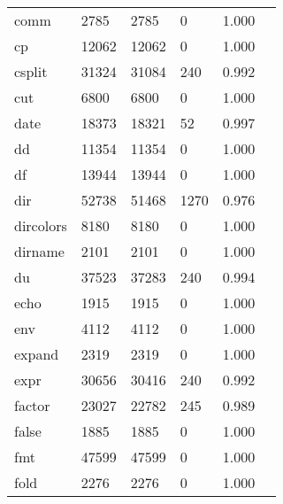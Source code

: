 \begin{longtable}{lp{2.40cm}p{2.40cm}p{2.40cm}p{2.40cm}p{2.40cm}}
comm      &                     2785 &         2785 &             0 &                    1.000 \\
cp        &                    12062 &        12062 &             0 &                    1.000 \\
csplit    &                    31324 &        31084 &           240 &                    0.992 \\
cut       &                     6800 &         6800 &             0 &                    1.000 \\
date      &                    18373 &        18321 &            52 &                    0.997 \\
dd        &                    11354 &        11354 &             0 &                    1.000 \\
df        &                    13944 &        13944 &             0 &                    1.000 \\
dir       &                    52738 &        51468 &          1270 &                    0.976 \\
dircolors &                     8180 &         8180 &             0 &                    1.000 \\
dirname   &                     2101 &         2101 &             0 &                    1.000 \\
du        &                    37523 &        37283 &           240 &                    0.994 \\
echo      &                     1915 &         1915 &             0 &                    1.000 \\
env       &                     4112 &         4112 &             0 &                    1.000 \\
expand    &                     2319 &         2319 &             0 &                    1.000 \\
expr      &                    30656 &        30416 &           240 &                    0.992 \\
factor    &                    23027 &        22782 &           245 &                    0.989 \\
false     &                     1885 &         1885 &             0 &                    1.000 \\
fmt       &                    47599 &        47599 &             0 &                    1.000 \\
fold      &                     2276 &         2276 &             0 &                    1.000 \\

\end{longtable}
